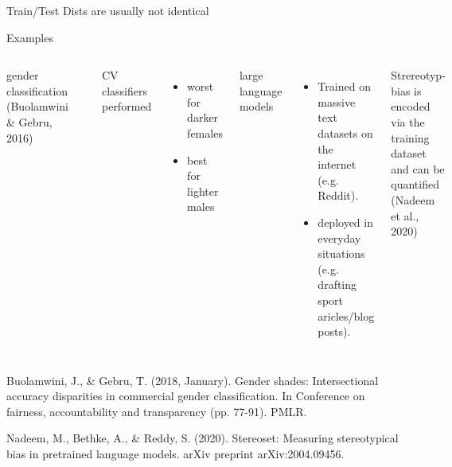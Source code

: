 \documentclass[11pt]{beamer}
\newcommand{\citeapa}[1]{ {\tiny#1\par} }
\begin{document}
	\begin{frame}{Train/Test Dists are usually not identical}
		
		Examples
		\begin{columns}[t]
				
				gender classification \\
				{\scriptsize (Buolamwini \& Gebru, 2016)}
				
				\vspace{1em}
				
				\includegraphics[width=\textwidth]{images/BoulamwiniGebru2016}
				
				\vspace{1em}
				
				CV classifiers performed
				\begin{itemize}
					\item worst for darker females
					\item best for lighter males
				\end{itemize}
			
			
				large language models
				
				\begin{itemize}
					\item Trained on massive text datasets on the internet (e.g. Reddit).
					\item deployed in everyday situations (e.g. drafting sport aricles/blog posts).
				\end{itemize}
			
				Strereotyp-bias is encoded via the training dataset and can be quantified {\scriptsize (Nadeem et al., 2020)}
			
		\end{columns}
		
		\vfill
	
		\citeapa{Buolamwini, J., \& Gebru, T. (2018, January). Gender shades: Intersectional accuracy disparities in commercial gender classification. In Conference on fairness, accountability and transparency (pp. 77-91). PMLR.}
		
		\citeapa{Nadeem, M., Bethke, A., \& Reddy, S. (2020). Stereoset: Measuring stereotypical bias in pretrained language models. arXiv preprint arXiv:2004.09456.}
	\end{frame}
\end{document}
